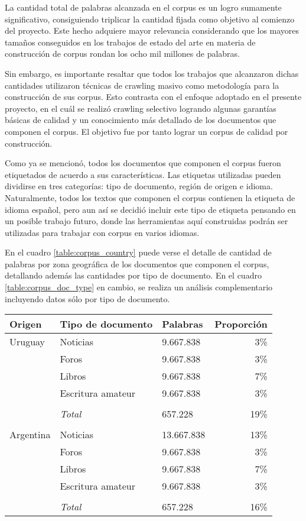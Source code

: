 La cantidad total de palabras alcanzada en el corpus es un logro sumamente significativo,
consiguiendo triplicar la cantidad fijada como objetivo al comienzo del proyecto. Este hecho
adquiere mayor relevancia considerando que los mayores tamaños conseguidos en los
trabajos de estado del arte en materia de construcción de corpus rondan los ocho mil
millones de palabras.

Sin embargo, es importante resaltar que todos los trabajos que alcanzaron dichas cantidades
utilizaron técnicas de crawling masivo como metodología para la construcción de sus corpus. Esto
contrasta con el enfoque adoptado en el presente proyecto, en el cuál se realizó crawling
selectivo logrando algunas garantías básicas de calidad y un conocimiento más detallado
de los documentos que componen el corpus. El objetivo fue por tanto lograr un corpus de
calidad por construcción.

Como ya se mencionó, todos los documentos que componen el corpus fueron etiquetados de
acuerdo a sus características. Las etiquetas utilizadas pueden dividirse en tres categorías:
tipo de documento, región de origen e idioma. Naturalmente, todos los textos que componen
el corpus contienen la etiqueta de idioma español, pero aun así se decidió incluir este tipo de
etiqueta pensando en un posible trabajo futuro, donde las herramientas aquí construidas podrán
ser utilizadas para trabajar con corpus en varios idiomas.

En el cuadro \ref{table:corpus_country} puede verse el detalle de cantidad de palabras por
zona geográfica de los documentos que componen el corpus, detallando además las
cantidades por tipo de documento. En el cuadro \ref{table:corpus_doc_type} en cambio, se
realiza un análisis complementario incluyendo datos sólo por tipo de documento.

\begin{table*}[t]
    \centering
    \begin{tabular}{lllr}
        \hline
        Origen & Tipo de documento & Palabras & Proporción\\
        \hline
        Uruguay & Noticias & 9.667.838 & 3\%\\
         & Foros & 9.667.838 & 3\%\\
         & Libros & 9.667.838 & 7\%\\
         & Escritura amateur & 9.667.838 & 3\%\\
         \\
         & \textit{Total} & 657.228 & 19\%\\
        \\
        Argentina & Noticias & 13.667.838 & 13\%\\
         & Foros & 9.667.838 & 3\%\\
         & Libros & 9.667.838 & 7\%\\
         & Escritura amateur & 9.667.838 & 3\%\\
         \\
         & \textit{Total} & 657.228 & 16\%\\
        \hline
    \end{tabular}
    \caption{Composición del corpus por zona geográfica.}
    \label{table:corpus_country}
\end{table*}

